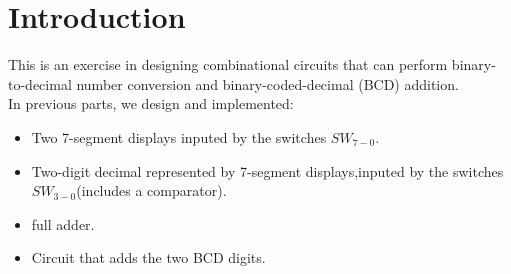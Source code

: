 \section{Introduction}
This is an exercise in designing combinational circuits that can perform binary-to-decimal number conversion and binary-coded-decimal (BCD) addition.\\
In previous parts, we design and implemented:
\begin{itemize}
    \item Two 7-segment displays inputed by the switches $SW_{7-0}$.
    \item Two-digit decimal represented by 7-segment displays,inputed by the switches $SW_{3-0}$(includes a comparator).
    \item full adder.
    \item Circuit that adds the two BCD digits.
\end{itemize}
